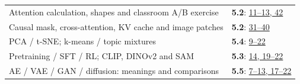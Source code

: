 \documentclass[10pt]{article}
\newcommand{\currenttopic}{Quick lookup}
\begin{document}
\begin{longtable}{@{}P{.62\linewidth}P{.34\linewidth}@{}}
Attention calculation, shapes and classroom A/B exercise & \textbf{5.2}: \href{../Lecture\%20Slides/5.2.\%20Transformers.pdf\#page=11}{11--13, 42}\\[3pt]
Causal mask, cross-attention, KV cache and image patches & \textbf{5.2}: \href{../Lecture\%20Slides/5.2.\%20Transformers.pdf\#page=31}{31--40}\\[3pt]
PCA / t-SNE; k-means / topic mixtures & \textbf{5.4}: \href{../Lecture\%20Slides/5.4.\%20Unsupervised\%20learning.pdf\#page=9}{9--22}\\[3pt]
Pretraining / SFT / RL; CLIP, DINOv2 and SAM & \textbf{5.3}: \href{../Lecture\%20Slides/5.3.\%20Foundation\%20models.pdf\#page=14}{14, 19--22}\\[3pt]
AE / VAE / GAN / diffusion: meanings and comparisons & \textbf{5.5}: \href{../Lecture\%20Slides/5.5.\%20Generative\%20Models.pdf\#page=7}{7--13, 17--22}\\[3pt]
\bottomrule\end{longtable}

\clearpage\renewcommand{\currenttopic}{Topic 1}
\end{document}

